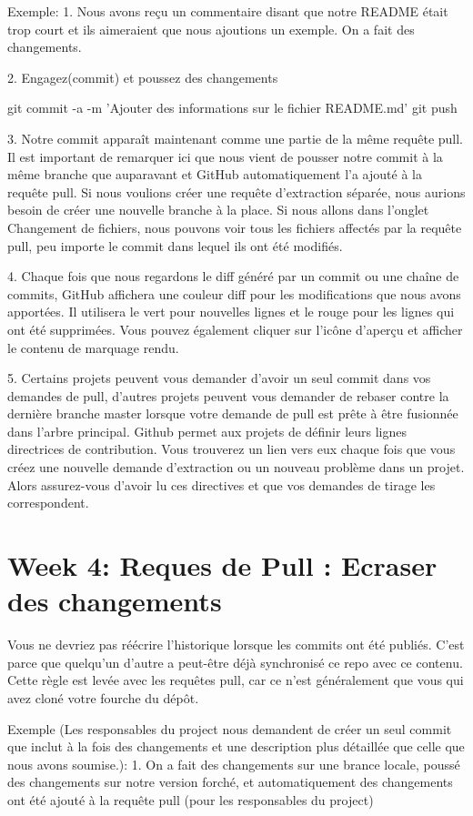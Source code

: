 \documentclass[11pt, onecolumn]{article}
\begin{document}
Exemple: 
1. Nous avons reçu un commentaire disant que notre README était trop court et ils aimeraient que nous ajoutions un exemple. On a fait des changements.

2. Engagez(commit) et poussez des changements

git commit -a -m 'Ajouter des informations sur le fichier README.md'
git push

3. Notre commit apparaît maintenant comme une partie de la même requête pull. Il est important de remarquer ici que nous vient de pousser notre commit à la même branche que auparavant et GitHub automatiquement l'a ajouté à la requête pull. Si nous voulions créer une requête d'extraction séparée, nous aurions besoin de créer une nouvelle branche à la place. Si nous allons dans l'onglet Changement de fichiers, nous pouvons voir tous les fichiers affectés par la requête pull, peu importe le commit dans lequel ils ont été modifiés. 

4. Chaque fois que nous regardons le diff généré par un commit ou une chaîne de commits, GitHub affichera une couleur diff pour les modifications que nous avons apportées. Il utilisera le vert pour nouvelles lignes et le rouge pour les lignes qui ont été supprimées. Vous pouvez également cliquer sur l'icône d'aperçu et afficher le contenu de marquage rendu. 

5. Certains projets peuvent vous demander d'avoir un seul commit dans vos demandes de pull, d'autres projets peuvent vous demander de rebaser contre la dernière branche master lorsque votre demande de pull est prête à être fusionnée dans l'arbre principal. Github permet aux projets de définir leurs lignes directrices de contribution. Vous trouverez un lien vers eux chaque fois que vous créez
une nouvelle demande d'extraction ou un nouveau problème dans un projet. Alors assurez-vous d'avoir lu ces directives et que vos demandes de tirage les correspondent.


\section{Week 4: Reques de Pull : Ecraser des changements}

Vous ne devriez pas réécrire l'historique lorsque les commits ont été publiés.
C'est parce que quelqu'un d'autre a peut-être déjà synchronisé ce repo avec ce contenu. Cette règle est levée avec les requêtes pull,
car ce n'est généralement que vous qui avez
cloné votre fourche du dépôt. 


Exemple (Les responsables du project nous demandent de créer un seul commit que
inclut à la fois des changements et une description plus détaillée que celle que nous avons soumise.): 
1. On a fait des changements sur une brance locale, poussé des changements sur notre version forché, et automatiquement des changements ont été ajouté à la requête pull (pour les responsables du project)
\end{document}
